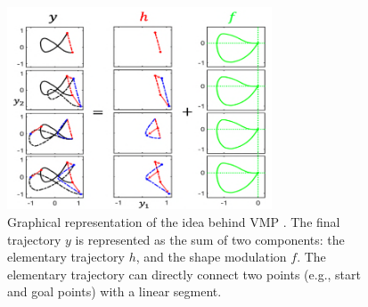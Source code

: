 \begin{figure}[t]
    \centering
    \includegraphics[width=0.7\textwidth]{figures/images/vmp/vmp.png}
    \caption{Graphical representation of the idea behind VMP \cite{zhou2019learning}. The final trajectory \( y \) is represented as the sum of two components: the elementary trajectory \( h \), and the shape modulation \( f \). The elementary trajectory can directly connect two points (e.g., start and goal points) with a linear segment.}
    \label{fig:vmp}
\end{figure}
